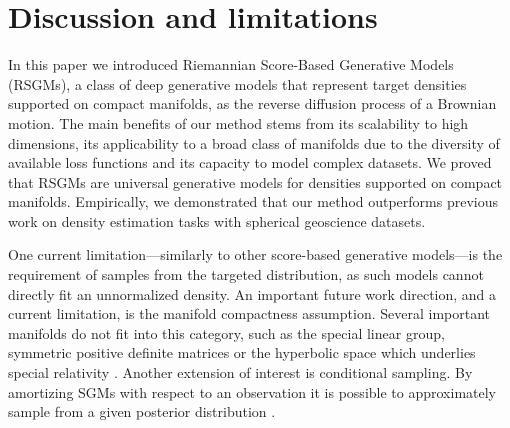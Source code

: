 \section{Discussion and limitations}
\label{sec:conclusion}

In this paper we introduced Riemannian Score-Based Generative Models (RSGMs), a class of deep generative models that represent target densities supported on compact manifolds, as the reverse diffusion process of a Brownian motion.
The main benefits of our method stems from its scalability to high dimensions, its applicability to a broad class of manifolds due to the diversity of available loss functions and its capacity to model complex datasets.
We proved that RSGMs are universal generative models for densities supported on compact manifolds. 
Empirically, we demonstrated that our method outperforms previous work on density estimation tasks with spherical geoscience datasets.


One current limitation---similarly to other score-based generative models---is the requirement of samples from the targeted distribution, as such models cannot directly fit an unnormalized density.
An important future work direction, and a current limitation, is the manifold compactness assumption.
Several important manifolds do not fit into this category, such as the special linear group, symmetric positive definite matrices or the hyperbolic space which underlies special relativity \citep{ungar2005Einstein}.
Another extension of interest is conditional sampling. By amortizing SGMs with respect to an observation it is possible to approximately sample from a given posterior distribution \citep[see for instance][]{kawar2021snips,kawar2021stochastic,lee2021priorgrad,sinha2021d2c,batzolis2021conditional,chung2021come}.


